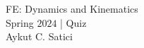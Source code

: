 \documentclass[addpoints, 12pt]{exam}
\begin{document}
\renewcommand{\arraystretch}{1.25}

\begin{center}

{\Large FE: Dynamics and Kinematics \\[0ex]
Spring $2024$ | Quiz} \\[2ex]
{\large Aykut C. Satici}
\end{center}


\end{document}
